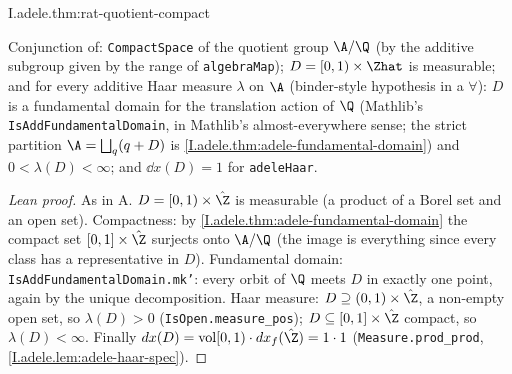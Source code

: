 \begin{theorem}
\end{theorem}
\begin{tfformal}{I.adele.thm:rat-quotient-compact}
\begin{tffidelity}
Conjunction of: \texttt{CompactSpace} of the quotient group $\A/\Q$ (by the additive subgroup given by the range of \texttt{algebraMap}); $D=[0,1)\times\Zhat$ is measurable; and for every additive Haar measure $\lambda$ on $\A$ (binder-style hypothesis in a $\forall$): $D$ is a fundamental domain for the translation action of $\Q$ (Mathlib's \texttt{IsAddFundamentalDomain}, in Mathlib's almost-everywhere sense; the strict partition $\A=\bigsqcup_q(q+D)$ is \cref{I.adele.thm:adele-fundamental-domain}) and $0<\lambda(D)<\infty$; and $\dd x(D)=1$ for \texttt{adeleHaar}.
\end{tffidelity}
\end{tfformal}
\begin{proof}[Lean proof]
As in A. $D=[0,1)\times\hat\Z$ is measurable (a product of a Borel set and an open set). Compactness: by \cref{I.adele.thm:adele-fundamental-domain} the compact set $[0,1]\times\hat\Z$ surjects onto $\A/\Q$ (the image is everything since every class has a representative in $D$). Fundamental domain: \texttt{IsAddFundamentalDomain.mk'}: every orbit of $\Q$ meets $D$ in exactly one point, again by the unique decomposition. Haar measure: $D\supseteq(0,1)\times\hat\Z$, a non-empty open set, so $\lambda(D)>0$ (\texttt{IsOpen.measure\_pos}); $D\subseteq[0,1]\times\hat\Z$ compact, so $\lambda(D)<\infty$. Finally $dx(D)=\mathrm{vol}[0,1)\cdot dx_f(\hat\Z)=1\cdot1$ (\texttt{Measure.prod\_prod}, \cref{I.adele.lem:adele-haar-spec}).
\end{proof}

